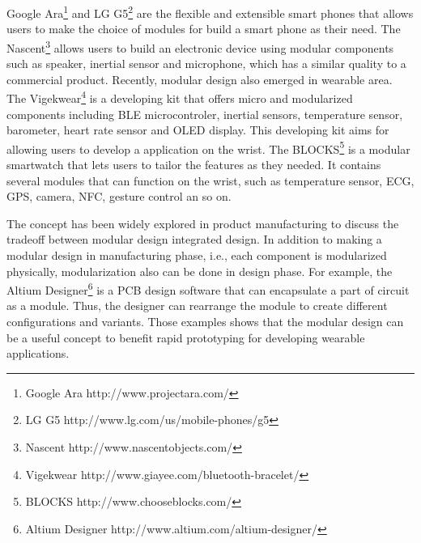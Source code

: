 Google Ara\footnote{Google Ara
\hspace{1cm} http://www.projectara.com/} and LG G5\footnote{LG G5
\hspace{1cm} http://www.lg.com/us/mobile-phones/g5} are the flexible and extensible smart phones that allows users to make the choice of modules for build a smart phone as their need.
The Nascent\footnote{Nascent
\hspace{1cm} http://www.nascentobjects.com/} allows users to build an electronic device using modular components such as speaker, inertial sensor and microphone, which has a similar quality to a commercial product.
Recently, modular design also emerged in wearable area.
The Vigekwear\footnote{Vigekwear
\hspace{1cm} http://www.giayee.com/bluetooth-bracelet/} is a developing kit that offers micro and modularized components including BLE microcontroler, inertial sensors, temperature sensor, barometer, heart rate sensor and OLED display.
This developing kit aims for allowing users to develop a application on the wrist.
The BLOCKS\footnote{BLOCKS
\hspace{1cm} http://www.chooseblocks.com/} is a modular smartwatch that lets users to tailor the features as they needed. It contains several modules that can function on the wrist, such as temperature sensor, ECG, GPS, camera, NFC, gesture control an so on.

The concept has been widely explored in product manufacturing to discuss the tradeoff between modular design integrated design\cite{schilling2000toward, ulrich1995role}. 
In addition to making a modular design in manufacturing phase, i.e., each component is modularized physically, modularization also can be done in design phase. For example, the Altium Designer\footnote{Altium Designer
\hspace{1cm} http://www.altium.com/altium-designer/} is a PCB design software that can encapsulate a part of circuit as a module. Thus, the designer can rearrange the module to create different configurations and variants.
Those examples shows that the modular design can be a useful concept to benefit rapid prototyping for developing wearable applications.


